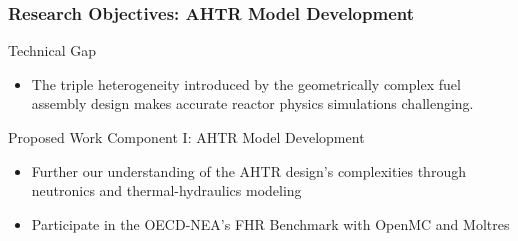 \begin{frame}
  \frametitle{Research Objectives: AHTR Model Development}
  \begin{block}{Technical Gap}
    \begin{itemize}
      \item The triple heterogeneity introduced by the geometrically complex 
      fuel assembly design makes accurate reactor physics simulations challenging. 
    \end{itemize}
  \end{block}
  \begin{block}{Proposed Work Component I: AHTR Model Development}
    \begin{itemize}
      \item Further our understanding of the AHTR design's complexities 
      through neutronics and thermal-hydraulics modeling
      \item Participate in the OECD-NEA's FHR Benchmark with 
      OpenMC and Moltres
    \end{itemize}
  \end{block}
\end{frame}